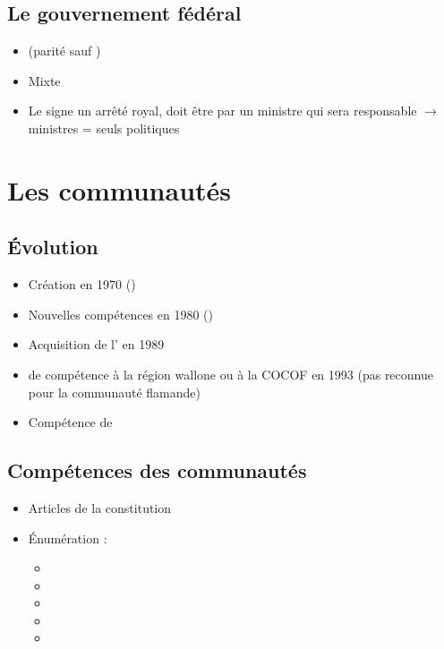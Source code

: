 \subsection{Le gouvernement fédéral}
\begin{itemize}
	\item {} (parité sauf )
	\item Mixte
	\item Le  signe un arrêté royal, doit être  par un ministre qui sera responsable $\rightarrow$ ministres = seuls  politiques 
\end{itemize}

\section{Les communautés}
\subsection{Évolution}
\begin{itemize}
	\item Création en 1970 ()
	\item Nouvelles compétences en 1980 ()
	\item Acquisition de l' en 1989
	\item {} de compétence à la région wallone ou à la COCOF en 1993 (pas reconnue pour la communauté flamande)
	\item Compétence de 
\end{itemize}

\subsection{Compétences des communautés}
\begin{itemize}
	\item Articles  de la constitution
	\item Énumération :
	\begin{itemize}
		\item {}
		\item {}
		\item {}
		\item {}
		\item {}
	\end{itemize}
\end{itemize}


